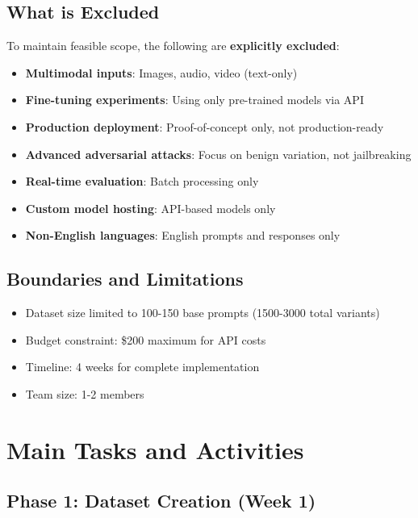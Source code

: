 \documentclass[11pt,a4paper]{article}
\begin{document}
\subsection{What is Excluded}

To maintain feasible scope, the following are \textbf{explicitly excluded}:

\begin{itemize}[leftmargin=*]
    \item \textbf{Multimodal inputs}: Images, audio, video (text-only)
    \item \textbf{Fine-tuning experiments}: Using only pre-trained models via API
    \item \textbf{Production deployment}: Proof-of-concept only, not production-ready
    \item \textbf{Advanced adversarial attacks}: Focus on benign variation, not jailbreaking
    \item \textbf{Real-time evaluation}: Batch processing only
    \item \textbf{Custom model hosting}: API-based models only
    \item \textbf{Non-English languages}: English prompts and responses only
\end{itemize}

\subsection{Boundaries and Limitations}

\begin{itemize}[leftmargin=*]
    \item Dataset size limited to 100-150 base prompts (1500-3000 total variants)
    \item Budget constraint: \$200 maximum for API costs
    \item Timeline: 4 weeks for complete implementation
    \item Team size: 1-2 members
\end{itemize}

\section{Main Tasks and Activities}

\subsection{Phase 1: Dataset Creation (Week 1)}
\end{document}
